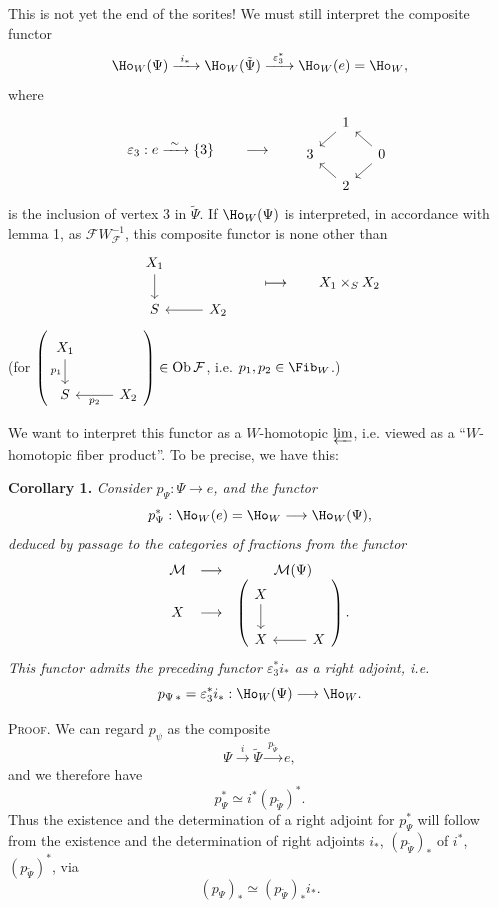 This is not yet the end of the sorites! We must still interpret the composite functor
\[
\Ho_W(\Psi)\xrightarrow{\ i_*\ }\Ho_W(\tilde{\Psi})\xrightarrow{\ \varepsilon_3^*\ }\Ho_W(e)=\Ho_W,
\]
where
\[
\varepsilon_3 : e\xrightarrow{\ \sim\ }\{3\}
\qquad\longrightarrow\qquad
\begin{tikzcd}[ampersand replacement=\&, column sep=small, row sep=small]
\& 1 \arrow[dl] \& \\
3 \& \& 0 \arrow[ul] \arrow[dl] \\
\& 2 \arrow[ul] \&
\end{tikzcd}
\]
is the inclusion of vertex 3 in $\tilde{\Psi}$. If $\Ho_W(\Psi)$ is interpreted, in accordance with lemma 1, as $\mathcal{F}W_{\mathcal{F}}^{-1}$, this composite functor is none other than
\[
\begin{tikzcd}[ampersand replacement=\&]
X_1 \arrow[d] \& \\
S \& X_2 \arrow[l]
\end{tikzcd}
\qquad\longmapsto\qquad X_1\times_S X_2
\]
(for $\left(\begin{tikzcd}[ampersand replacement=\&] X_1 \arrow[d, "p_1"'] \& \\ S \& X_2 \arrow[l, "p_2"] \end{tikzcd}\right)\in \mathrm{Ob}\,\mathcal{F}$, i.e. $p_1,p_2\in\Fib_W$.)

We want to interpret this functor as a $W$-homotopic $\varprojlim$, i.e. viewed as a ``$W$-homotopic fiber product''. To be precise, we have this:

\textbf{Corollary 1.} \textit{Consider $p_\Psi : \Psi\longrightarrow e$, and the functor}
\[
p_\Psi^* : \Ho_W(e)=\Ho_W\longrightarrow\Ho_W(\Psi),
\]
\textit{deduced by passage to the categories of fractions from the functor}
\[
\begin{array}{ccc}
\mathcal{M} & \longrightarrow & \mathcal{M}(\Psi) \\
X & \longrightarrow & \left(
\begin{tikzcd}[ampersand replacement=\&]
X \arrow[d] \& \\
X \& X \arrow[l]
\end{tikzcd}
\right).
\end{array}
\]
\textit{This functor admits the preceding functor $\varepsilon_3^*i_*$ as a right adjoint, i.e.}
\[
p_{\Psi\,*}=\varepsilon_3^*i_* : \Ho_W(\Psi)\longrightarrow\Ho_W.
\]

\textsc{Proof}. We can regard $p_\psi$ as the composite %
\[
\Psi\xrightarrow{\ i\ }\tilde{\Psi}\xrightarrow{\ p_{\tilde{\Psi}}\ }e,
\]
and we therefore have
\[
p_\Psi^*\simeq i^*(p_{\tilde{\Psi}})^*.
\]
Thus the existence and the determination of a right adjoint for $p_\Psi^*$ will follow from the existence and the determination of right adjoints $i_*$, $(p_{\tilde{\Psi}})_*$ of $i^*$, $(p_{\tilde{\Psi}})^*$, via
\[
(p_\Psi)_*\simeq(p_{\tilde{\Psi}})_*i_*.
\]

